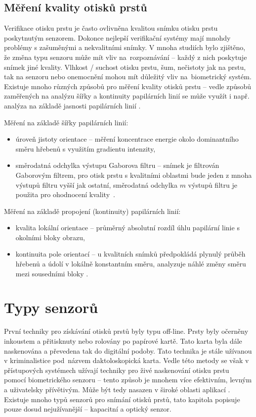 \subsection*{Měření kvality otisků prstů}
Verifikace otisku prstu je často ovlivněna kvalitou snímku otisku prstu poskytnutým senzorem. Dokonce nejlepší verifikační systémy mají mnohdy problémy s zašuměnými a nekvalitními snímky. V mnoha studiích bylo zjištěno, že změna typu senzoru může mít vliv na~rozpoznávání -- každý z nich poskytuje snímek jiné kvality. Vlhkost / suchost otisku prstu, šum, nečistoty jak na prstu, tak na senzoru nebo onemocnění mohou mít důležitý vliv na~biometrický systém. Existuje mnoho různých způsobů pro měření kvality otisků prstu -- vedle způsobů zaměřených na analýzu šířky a kontinuity papilárních linií se může využít i např. analýza na základě jasnosti papilárních linií \cite{FingerprintQuality}.

Měření na základě šířky papilárních linií:
\begin{itemize}
    \item úroveň jistoty orientace -- měření koncentrace energie okolo dominantního směru hřebenů s využitím gradientu intenzity,
    \item směrodatná odchylka výstupu Gaborova filtru -- snímek je filtrován Gaborovým filtrem, pro otisk prstu s kvalitními oblastmi bude jeden z mnoha výstupů filtru vyšší jak ostatní, směrodatná odchylka $m$ výstupů filtru je použita pro ohodnocení kvality~\cite{FingerprintQuality}.
\end{itemize}

Měření na základě propojení (kontinuity) papilárních linií:
\begin{itemize}
    \item kvalita lokální orientace -- průměrný absolutní rozdíl úhlu papilární linie s okolními bloky obrazu,
    \item kontinuita pole orientací -- u kvalitních snímků předpokládá plynulý průběh hřebenů a údolí v lokálně konstantním směru, analyzuje náhlé změny směru mezi sousedními bloky \cite{FingerprintQuality}.
\end{itemize}




\section{Typy senzorů}
První techniky pro získávání otisků prstů byly typu off-line. Prsty byly očerněny inkoustem a přitisknuty nebo rolovány po papírové kartě. Tato karta byla dále naskenována a převedena tak do digitální podoby. Tato technika je stále užívanou v kriminalistice pod~názvem daktoloskopická karta. Vedle této metody se však v přístupových systémech užívají techniky pro živé naskenování otisku prstu pomocí biometrického senzoru -- tento způsob je mnohem více efektivním, levným a uživatelsky přívětivým. Může být tedy nasazen v široké oblasti aplikací \cite{Maltoni2009}. Existuje mnoho typů senzorů pro snímání otisků prstů, tato kapitola popisuje pouze dosud nejužívanější -- kapacitní a optický senzor.

